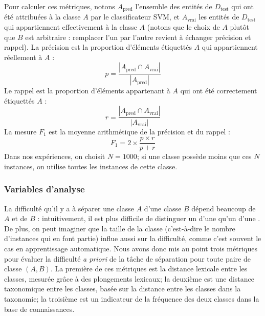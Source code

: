 Pour calculer ces métriques, notons $A_\textrm{pred}$ l'ensemble des entités de $D_\textrm{test}$ qui ont été attribuées à la classe $A$ par le classificateur SVM, et $A_\textrm{vrai}$ les entités de $D_\textrm{test}$ qui appartiennent effectivement à la classe $A$ (notons que le choix de $A$ plutôt que $B$ est arbitraire : remplacer l'un par l'autre revient à échanger précision et rappel).
La précision est la proportion d'éléments étiquettés $A$ qui appartiennent réellement à $A$ :
\begin{equation*}
    p = \frac{|A_\textrm{pred} \cap A_\textrm{vrai}|}{|A_\textrm{pred}|}
\end{equation*}
Le rappel est la proportion d'éléments appartenant à $A$ qui ont été correctement étiquettés $A$ :
\begin{equation*}
    r = \frac{|A_\textrm{pred} \cap A_\textrm{vrai}|}{|A_\textrm{vrai}|}
\end{equation*}
La mesure $F_1$ est la moyenne arithmétique de la précision et du rappel :
\begin{equation*}
    F_1 = 2 \times \frac{p \times r}{p + r}
\end{equation*}
Dans nos expériences, on choisit $N=1000$; si une classe possède moins que ces $N$ instances, on utilise toutes les instances de cette classe.



\subsubsection{Variables d'analyse}

La difficulté qu'il y a à séparer une classe $A$ d'une classe $B$ dépend beaucoup de $A$ et de $B$ : intuitivement, il est plus difficile de distinguer un  d'une  qu'un  d'une . De plus, on peut imaginer que la taille de la classe (c'est-à-dire le nombre d'instances qui en font partie) influe aussi sur la difficulté, comme c'est souvent le cas en apprentissage automatique. Nous avons donc mis au point trois métriques pour évaluer la difficulté \textit{a priori} de la tâche de séparation pour toute paire de classe $(A, B)$. La première de ces métriques est la distance lexicale entre les classes, mesurée grâce à des plongements lexicaux; la deuxième est une distance taxonomique entre les classes, basée sur la distance entre les classes dans la taxonomie; la troisième est un indicateur de la fréquence des deux classes dans la base de connaissances.

